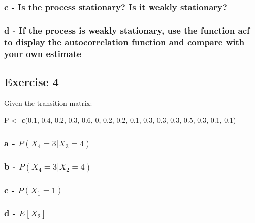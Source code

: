 \documentclass[]{article}
\newenvironment{Shaded}{\begin{snugshade}}{\end{snugshade}}
\newcommand{\DecValTok}[1]{\textcolor[rgb]{0.00,0.00,0.81}{#1}}
\newcommand{\FloatTok}[1]{\textcolor[rgb]{0.00,0.00,0.81}{#1}}
\newcommand{\KeywordTok}[1]{\textcolor[rgb]{0.13,0.29,0.53}{\textbf{#1}}}
\newcommand{\NormalTok}[1]{#1}
\newcommand{\StringTok}[1]{\textcolor[rgb]{0.31,0.60,0.02}{#1}}
\begin{document}
\hypertarget{c---is-the-process-stationary-is-it-weakly-stationary}{%
\subsubsection{c - Is the process stationary? Is it weakly
stationary?}\label{c---is-the-process-stationary-is-it-weakly-stationary}}

\hypertarget{d---if-the-process-is-weakly-stationary-use-the-function-acf-to-display-the-autocorrelation-function-and-compare-with-your-own-estimate}{%
\subsubsection{d - If the process is weakly stationary, use the function
acf to display the autocorrelation function and compare with your own
estimate}\label{d---if-the-process-is-weakly-stationary-use-the-function-acf-to-display-the-autocorrelation-function-and-compare-with-your-own-estimate}}

\hypertarget{exercise-4}{%
\subsection{Exercise 4}\label{exercise-4}}

Given the transition matrix:

\begin{Shaded}
\begin{Highlighting}[]
\NormalTok{P <-}\StringTok{ }\KeywordTok{c}\NormalTok{(}\FloatTok{0.1}\NormalTok{, }\FloatTok{0.4}\NormalTok{, }\FloatTok{0.2}\NormalTok{, }\FloatTok{0.3}\NormalTok{,}
       \FloatTok{0.6}\NormalTok{,   }\DecValTok{0}\NormalTok{, }\FloatTok{0.2}\NormalTok{, }\FloatTok{0.2}\NormalTok{,}
       \FloatTok{0.1}\NormalTok{, }\FloatTok{0.3}\NormalTok{, }\FloatTok{0.3}\NormalTok{, }\FloatTok{0.3}\NormalTok{,}
       \FloatTok{0.5}\NormalTok{, }\FloatTok{0.3}\NormalTok{, }\FloatTok{0.1}\NormalTok{, }\FloatTok{0.1}\NormalTok{)}
\end{Highlighting}
\end{Shaded}

\hypertarget{a---px_4-3-x_3-4}{%
\subsubsection{\texorpdfstring{a -
\(P(X_{4} = 3 | X_{3} = 4)\)}{a - P(X\_\{4\} = 3 \textbar{} X\_\{3\} = 4)}}\label{a---px_4-3-x_3-4}}

\hypertarget{b---px_4-3-x_2-4}{%
\subsubsection{\texorpdfstring{b -
\(P(X_{4} = 3 | X_{2} = 4)\)}{b - P(X\_\{4\} = 3 \textbar{} X\_\{2\} = 4)}}\label{b---px_4-3-x_2-4}}

\hypertarget{c---px_1-1}{%
\subsubsection{\texorpdfstring{c -
\(P(X_{1} = 1)\)}{c - P(X\_\{1\} = 1)}}\label{c---px_1-1}}

\hypertarget{d---ex_2}{%
\subsubsection{\texorpdfstring{d -
\(E[X_{2}]\)}{d - E{[}X\_\{2\}{]}}}\label{d---ex_2}}
\end{document}
